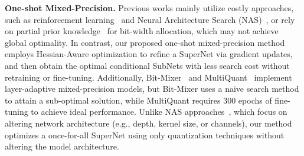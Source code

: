 {\bf One-shot Mixed-Precision.} 
Previous works mainly utilize costly approaches, such as reinforcement learning~\cite{Wang2019,elthakeb2019releq} and Neural Architecture Search (NAS)~\cite{wu2018mixed,guo2020single,Shen2021}, or rely on partial prior knowledge~\cite{liu2021sharpness,yao2021hawq} for bit-width allocation, which may not achieve global optimality. In contrast, our proposed one-shot mixed-precision method employs Hessian-Aware optimization to refine a SuperNet via gradient updates, and then obtain the optimal conditional SubNets with less search cost without retraining or fine-tuning. Additionally, Bit-Mixer~\cite{Bulat2021} and MultiQuant~\cite{Xu2022} implement layer-adaptive mixed-precision models, but Bit-Mixer uses a naive search method to attain a sub-optimal solution, while MultiQuant requires 300 epochs of fine-tuning to achieve ideal performance. Unlike NAS approaches~\cite{Shen2021}, which focus on altering network architecture (e.g., depth, kernel size, or channels), our method optimizes a once-for-all SuperNet using only quantization techniques without altering the model architecture.